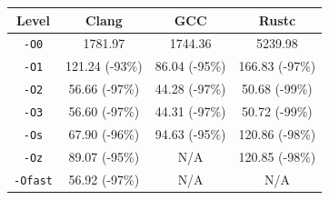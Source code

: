 \begin{tabular*}{\columnwidth}{@{\extracolsep\fill}cccc@{\extracolsep\fill}}
\toprule
\textbf{Level} & \textbf{Clang} & \textbf{GCC} & \textbf{Rustc} \\
\midrule
\texttt{-O0} & 1781.97 & 1744.36 & 5239.98 \\
\texttt{-O1} & 121.24 (-93\%) & 86.04 (-95\%) & 166.83 (-97\%) \\
\texttt{-O2} & 56.66 (-97\%) & 44.28 (-97\%) & 50.68 (-99\%) \\
\texttt{-O3} & 56.60 (-97\%) & 44.31 (-97\%) & 50.72 (-99\%) \\
\texttt{-Os} & 67.90 (-96\%) & 94.63 (-95\%) & 120.86 (-98\%) \\
\texttt{-Oz} & 89.07 (-95\%) & N/A & 120.85 (-98\%) \\
\texttt{-Ofast} & 56.92 (-97\%) & N/A & N/A \\
\bottomrule
\end{tabular*}
